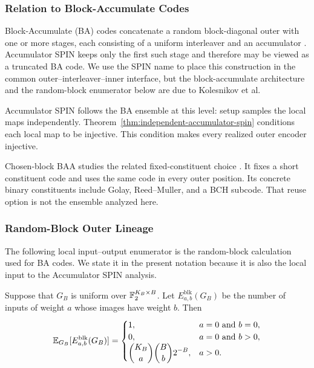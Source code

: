 \subsubsection{Relation to Block-Accumulate Codes}

Block-Accumulate (BA) codes concatenate a random block-diagonal outer with
one or more stages, each consisting of a uniform interleaver and an accumulator
\cite{KolesnikovEtAl2026BA}. Accumulator SPIN keeps only the first such stage and
therefore may be viewed as a truncated BA code. We use the SPIN name to
place this construction in the common outer--interleaver--inner interface, but
the block-accumulate architecture and the random-block enumerator below are
due to Kolesnikov et al.

Accumulator SPIN follows the BA ensemble at this level: setup samples the
local maps independently. Theorem~\ref{thm:independent-accumulator-spin} conditions each local map to
be injective. This condition makes every realized outer encoder injective.

Chosen-block BAA studies the related fixed-constituent choice
\cite{cryptoeprint:2026/1903}. It fixes a short constituent code and
uses the same code in every outer position. Its concrete binary constituents
include Golay, Reed--Muller, and a BCH subcode. That reuse option is not the
ensemble analyzed here.

\subsubsection{Random-Block Outer Lineage}

The following local input--output enumerator is the random-block calculation
used for BA codes. We state it in the present notation because it is also the
local input to the Accumulator SPIN analysis.

\begin{lemma}
\label{lem:uniform-random-block-enumerator}
Suppose that $G_B$ is uniform over $\mathbb F_2^{K_B\times B}$. Let
$E^{\mathrm{blk}}_{a,b}(G_B)$ be the number of inputs of weight $a$ whose
images have weight $b$. Then
\begin{equation}
  \mathbb E_{G_B}[E^{\mathrm{blk}}_{a,b}(G_B)]
  =
  \begin{cases}
    1, & a=0 \text{ and } b=0,\\
    0, & a=0 \text{ and } b>0,\\
    \displaystyle
    \binom{K_B}{a}\binom{B}{b}2^{-B}, & a>0.
  \end{cases}
  \label{eq:uniform-random-block-enumerator}
\end{equation}
\end{lemma}

